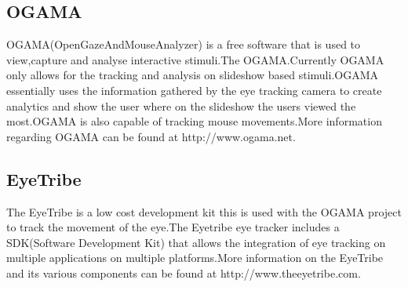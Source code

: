 \subsection{OGAMA}
OGAMA(OpenGazeAndMouseAnalyzer) is a free software that is used to view,capture and analyse interactive stimuli.The OGAMA.Currently OGAMA only allows for the tracking and analysis on slideshow based stimuli.OGAMA essentially uses the information gathered by the eye tracking camera to create analytics and show the user where on the slideshow the users viewed the most.OGAMA is also capable of tracking mouse movements.More information regarding OGAMA can be found at http://www.ogama.net.
\subsection{EyeTribe}
The EyeTribe is a low cost development kit this is used with the OGAMA project to track the movement of the eye.The Eyetribe eye tracker includes a SDK(Software Development Kit) that allows the integration of eye tracking on multiple applications on multiple platforms.More information on the EyeTribe and its various components can be found at http://www.theeyetribe.com.
